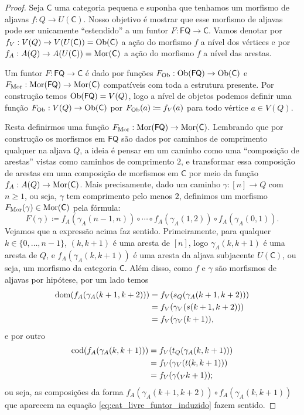 \begin{proof}
    Seja $\mathsf{C}$ uma categoria pequena e suponha que tenhamos um morfismo de aljavas $f: Q \to U(\mathsf{C})$.
    Nosso objetivo é mostrar que esse morfismo de aljavas pode ser unicamente ``estendido'' a um funtor $F: \mathsf{FQ} \to \mathsf{C}$.
    Vamos denotar por $f_V: V(Q) \to V(U(\mathsf{C})) = \mathrm{Ob}(\mathsf{C})$ a ação do morfismo $f$ a nível dos vértices e por $f_A: A(Q) \to A(U(\mathsf{C})) = \mathrm{Mor}(\mathsf{C})$ a ação do morfismo $f$ a nível das arestas.

    Um funtor $F: \mathsf{FQ} \to \mathsf{C}$ é dado por funções $F_{\mathrm{Ob}}: \mathrm{Ob}(\mathsf{FQ}) \to \mathrm{Ob}(\mathsf{C})$ e $F_{\mathrm{Mor}}: \mathrm{Mor}(\mathsf{FQ}) \to \mathrm{Mor}(\mathsf{C})$ compatíveis com toda a estrutura presente.
    Por construção temos $\mathrm{Ob}(\mathsf{FQ}) = V(Q)$, logo a nível de objetos podemos definir uma função $F_{\mathrm{Ob}}: V(Q) \to \mathrm{Ob}(\mathsf{C})$ por $F_{\mathrm{Ob}}(a) \coloneqq f_V(a)$ para todo vértice $a \in V(Q)$.

    Resta definirmos uma função $F_{\mathrm{Mor}}: \mathrm{Mor}(\mathsf{FQ}) \to \mathrm{Mor}(\mathsf{C})$.
    Lembrando que por construção os morfismos em $\mathsf{FQ}$ são dados por caminhos de comprimento qualquer na aljava $Q$, a ideia é pensar em um caminho como uma ``composição de arestas'' vistas como caminhos de comprimento $2$, e transformar essa composição de arestas em uma composição de morfismos em $\mathsf{C}$ por meio da função $f_A: A(Q) \to \mathrm{Mor}(\mathsf{C})$.
    Mais precisamente, dado um caminho $\gamma: [n] \to Q$ com $n \geq 1$, ou seja, $\gamma$ tem comprimento pelo menos $2$, definimos um morfismo $F_{\mathrm{Mor}}(\gamma) \in \mathrm{Mor}(\mathsf{C})$ pela fórmula:
    \begin{equation}\label{eq:cat_livre_funtor_induzido}
        F(\gamma) \coloneqq f_A(\gamma_A(n-1,n)) \circ \dotsm \circ f_A(\gamma_A(1,2)) \circ f_A(\gamma_A(0,1)).
    \end{equation}
    Vejamos que a expressão acima faz sentido.
    Primeiramente, para qualquer $k \in \{0,\dots,n-1\}$, $(k,k+1)$ é uma aresta de $[n]$, logo $\gamma_A(k,k+1)$ é uma aresta de $Q$, e $f_A(\gamma_A(k,k+1))$ é uma aresta da aljava subjacente $U(\mathsf{C})$, ou seja, um morfismo da categoria $\mathsf{C}$.
    Além disso, como $f$ e $\gamma$ são morfismos de aljavas por hipótese, por um lado temos
    \begin{align*}
        \mathrm{dom}(f_A(\gamma_A(k+1,k+2)))
        & = f_V(s_Q(\gamma_A(k+1,k+2))) \\
        & = f_V(\gamma_V(s(k+1,k+2))) \\
        & = f_V(\gamma_V(k+1)),
    \end{align*}
    e por outro
    \begin{align*}
        \mathrm{cod}(f_A(\gamma_A(k,k+1)))
        & = f_V(t_Q(\gamma_A(k,k+1))) \\
        & = f_V(\gamma_V(t(k,k+1))) \\
        & = f_V(\gamma(_Vk+1));
    \end{align*}
    ou seja, as composições da forma $f_A(\gamma_A(k+1,k+2)) \circ f_A(\gamma_A(k,k+1))$ que aparecem na equação \eqref{eq:cat_livre_funtor_induzido} fazem sentido.


\end{proof}
